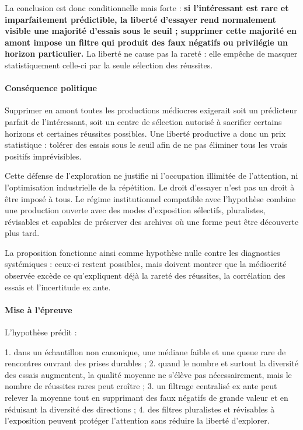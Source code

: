 \documentclass[10pt,a4paper]{article}
\begin{document}
La conclusion est donc conditionnelle mais forte : \textbf{si l'intéressant est rare et imparfaitement prédictible, la liberté d'essayer rend normalement visible une majorité d'essais sous le seuil ; supprimer cette majorité en amont impose un filtre qui produit des faux négatifs ou privilégie un horizon particulier.} La liberté ne cause pas la rareté : elle empêche de masquer statistiquement celle-ci par la seule sélection des réussites.

\paragraph{Conséquence politique}
Supprimer en amont toutes les productions médiocres exigerait soit un prédicteur parfait de l'intéressant, soit un centre de sélection autorisé à sacrifier certains horizons et certaines réussites possibles. Une liberté productive a donc un prix statistique : tolérer des essais sous le seuil afin de ne pas éliminer tous les vrais positifs imprévisibles.

Cette défense de l'exploration ne justifie ni l'occupation illimitée de l'attention, ni l'optimisation industrielle de la répétition. Le droit d'essayer n'est pas un droit à être imposé à tous. Le régime institutionnel compatible avec l'hypothèse combine une production ouverte avec des modes d'exposition sélectifs, pluralistes, révisables et capables de préserver des archives où une forme peut être découverte plus tard.

La proposition fonctionne ainsi comme hypothèse nulle contre les diagnostics systémiques : ceux-ci restent possibles, mais doivent montrer que la médiocrité observée excède ce qu'expliquent déjà la rareté des réussites, la corrélation des essais et l'incertitude ex ante.

\paragraph{Mise à l'épreuve}
L'hypothèse prédit :

1. dans un échantillon non canonique, une médiane faible et une queue rare de rencontres    ouvrant des prises durables ; 2. quand le nombre et surtout la diversité des essais augmentent, la qualité moyenne ne    s'élève pas nécessairement, mais le nombre de réussites rares peut croître ; 3. un filtrage centralisé ex ante peut relever la moyenne tout en supprimant des faux    négatifs de grande valeur et en réduisant la diversité des directions ; 4. des filtres pluralistes et révisables à l'exposition peuvent protéger l'attention    sans réduire la liberté d'explorer.
\end{document}
